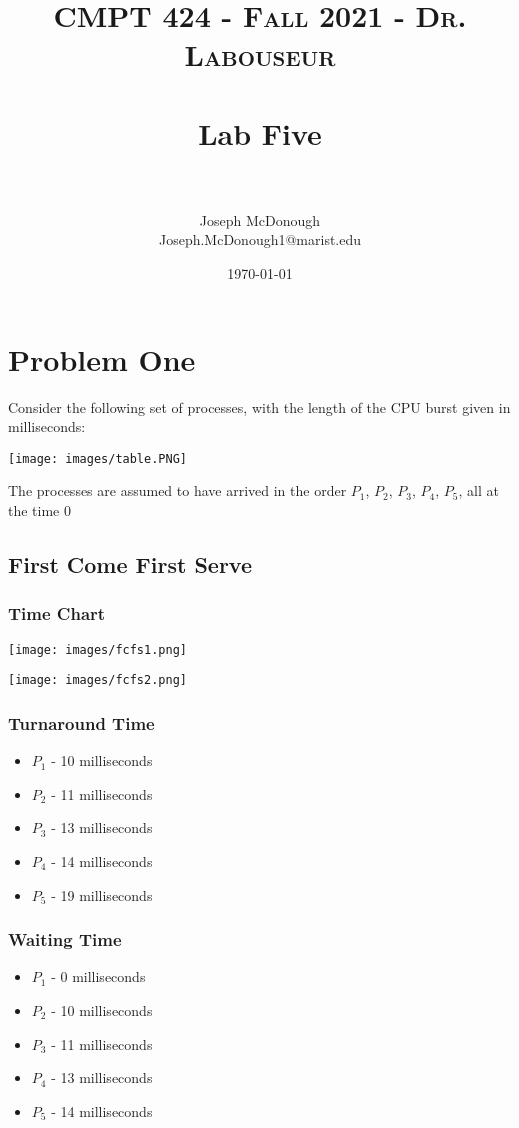 \documentclass[letterpaper, 10pt,DIV=13]{scrartcl}
\title{	
   \normalfont \normalsize 
   \textsc{CMPT 424 - Fall 2021 - Dr. Labouseur} \\[10pt] %
   \horrule{0.5pt} \\[0.25cm] 	%
   \huge Lab Five  \\     	    %
   \horrule{0.5pt} \\[0.25cm] 	%
}
\author{Joseph McDonough \\ \normalsize Joseph.McDonough1@marist.edu}
\date{\normalsize\today} 	%
\numberwithin{equation}{section} %
\numberwithin{figure}{section} %
\numberwithin{table}{section} %
\begin{document}
\maketitle %

\section{Problem One}

Consider the following set of processes, with the length of the CPU burst given in milliseconds:

\begin{center}\texttt{[image: images/table.PNG]}\end{center}

The processes are assumed to have arrived in the order $P_1$, $P_2$, $P_3$, $P_4$, $P_5$, all at the time 0

\subsection{First Come First Serve}
\subsubsection{Time Chart}

\begin{center}\texttt{[image: images/fcfs1.png]}\end{center}
\begin{center}\texttt{[image: images/fcfs2.png]}\end{center}

\subsubsection{Turnaround Time}
\begin{itemize}
    \item $P_1$ - 10 milliseconds
    \item $P_2$ - 11 milliseconds
    \item $P_3$ - 13 milliseconds
    \item $P_4$ - 14 milliseconds
    \item $P_5$ - 19 milliseconds
\end{itemize}

\subsubsection{Waiting Time}
\begin{itemize}
    \item $P_1$ - 0 milliseconds
    \item $P_2$ - 10 milliseconds
    \item $P_3$ - 11 milliseconds
    \item $P_4$ - 13 milliseconds
    \item $P_5$ - 14 milliseconds
\end{itemize}
\end{document}
